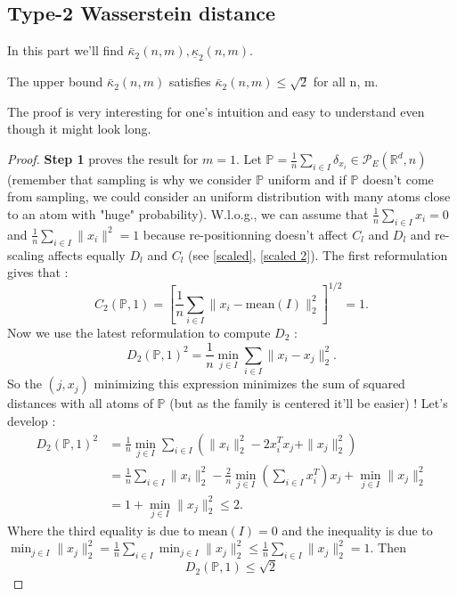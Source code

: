 \documentclass{amsart}
\newcommand{\RR}{\mathbb{R}}
\begin{document}
\subsection{Type-2 Wasserstein distance}
In this part we'll find $\bar{\kappa}_2\left(n,m\right), \underline\kappa_2\left(n,m\right)$.
\begin{theorem}
    The upper bound $\bar\kappa_2\left(n,m\right)$ satisfies $\bar\kappa_2\left(n,m\right)\leq \sqrt{2}$ for all n, m.
\end{theorem}
The proof is very interesting for one's intuition and easy to understand even though it might look long.
\begin{proof}
    \textbf{Step 1} proves the result for $m=1$. Let $\mathbb{P}=\frac{1}{n}\sum_{i\in I}\delta_{x_i}\in\mathcal{P}_E\left(\RR^d,n\right)$ (remember that sampling is why we consider $\mathbb{P}$ uniform and if $\mathbb{P}$ doesn't come from sampling, we could consider an uniform distribution with many atoms close to an atom with "huge" probability). W.l.o.g., we can assume that $\frac{1}{n}\sum_{i\in I}x_i=0$ and $\frac{1}{n}\sum_{i\in I}\lVert x_i\rVert^2=1$ because re-positionning doesn't affect $C_l$ and $D_l$ and re-scaling affects equally $D_l$ and $C_l$ (see \ref{scaled}, \ref{scaled 2}).
    \newline
    The first reformulation gives that :
    $$
    C_2\left(\mathbb{P},1\right)=\left[\frac{1}{n}\sum_{i\in I}\lVert x_i-\text{mean}(I)\rVert_2^2\right]^{1/2}=1.
    $$
    Now we use the latest reformulation to compute $D_2$ :
    $$
    D_2\left(\mathbb{P},1\right)^2=\frac{1}{n}\min_{j\in I}\sum_{i\in I}\lVert x_i-x_j\rVert^2_2.
    $$
    So the $\left(j, x_j\right)$ minimizing this expression minimizes the sum of squared distances with all atoms of $\mathbb{P}$ (but as the family is centered it'll be easier) ! Let's develop :
    \begin{align*}
    D_2\left(\mathbb{P},1\right)^2&=\frac{1}{n}\min_{j\in I}\sum_{i\in I}\left(\rVert x_i\rVert^2_2-2x_i^Tx_j+\rVert x_j\rVert^2_2\right)\\&=\frac{1}{n}\sum_{i\in I}\lVert x_i\rVert_2^2-\frac{2}{n}\min_{j\in I}\left(\sum_{i\in I}x_i^T\right)x_j+\min_{j\in I}\lVert x_j\rVert^2_2 \\&=1+\min_{j\in I}\lVert x_j\rVert^2_2\leq2.
    \end{align*}
Where the third equality is due to $\text{mean}(I)=0$ and the inequality is due to $\min_{j\in I}\lVert x_j\rVert^2_2=\frac{1}{n}\sum_{i\in I}\min_{j\in I}\lVert x_j\rVert^2_2\leq \frac{1}{n}\sum_{i\in I}\lVert x_j\rVert^2_2=1$. Then $$D_2\left(\mathbb{P},1\right)\leq\sqrt{2}$$

\end{proof}
\end{document}
